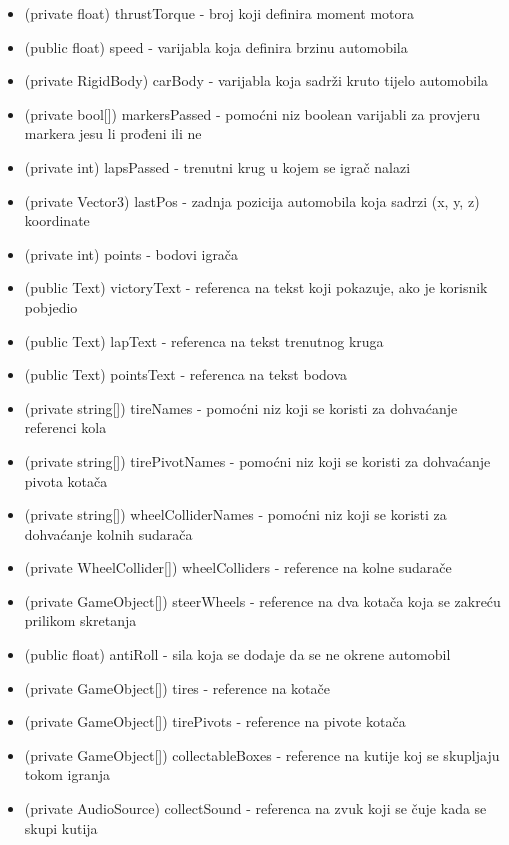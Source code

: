 \begin{itemize}
	\item (private float) thrustTorque - broj koji definira moment motora
	\item (public float) speed - varijabla koja definira brzinu automobila
	\item (private RigidBody) carBody - varijabla koja sadrži kruto tijelo automobila
	\item (private bool[]) markersPassed - pomoćni niz boolean varijabli za provjeru markera jesu li prođeni ili ne
	\item (private int) lapsPassed - trenutni krug u kojem se igrač nalazi
	\item (private Vector3) lastPos - zadnja pozicija automobila koja sadrzi (x, y, z) koordinate
	\item (private int) points - bodovi igrača
	\item (public Text) victoryText - referenca na tekst koji pokazuje, ako je korisnik pobjedio
	\item (public Text) lapText - referenca na tekst trenutnog kruga
	\item (public Text) pointsText - referenca na tekst bodova 
	\item (private string[]) tireNames - pomoćni niz koji se koristi za dohvaćanje referenci kola
	\item (private string[]) tirePivotNames - pomoćni niz koji se koristi za dohvaćanje pivota kotača
	\item (private string[]) wheelColliderNames - pomoćni niz koji se koristi za dohvaćanje kolnih sudarača
	\item (private WheelCollider[]) wheelColliders - reference na kolne sudarače
	\item (private GameObject[]) steerWheels - reference na dva kotača koja se zakreću prilikom skretanja
	\item (public float) antiRoll - sila koja se dodaje da se ne okrene automobil
	\item (private GameObject[]) tires - reference na kotače
	\item (private GameObject[]) tirePivots - reference na pivote kotača
	\item (private GameObject[]) collectableBoxes - reference na kutije koj se skupljaju tokom igranja
	\item (private AudioSource) collectSound - referenca na zvuk koji se čuje kada se skupi kutija
\end{itemize}
\newpage
